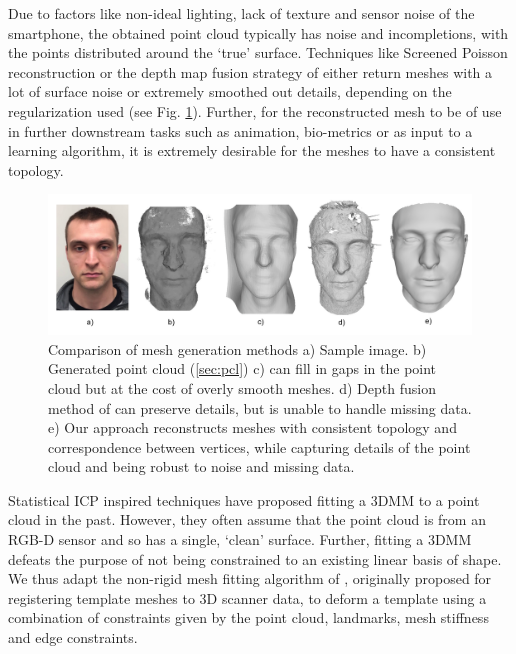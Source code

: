 \documentclass[10pt,twocolumn,letterpaper]{article}
\begin{document}
Due to factors like non-ideal lighting, lack of texture and sensor noise of the smartphone, the obtained point cloud typically has noise and incompletions, with the points distributed around the `true' surface.
 Techniques like Screened Poisson reconstruction or the depth map fusion strategy of \cite{hernandez2015near} either return meshes with a lot of surface noise or extremely smoothed out details, depending on the regularization used (see Fig. \ref{fig:mesh_comp}). Further, for the reconstructed mesh to be of use in further downstream tasks such as animation, bio-metrics or as input to a learning algorithm, it is extremely desirable for the meshes to have a consistent topology. \\
 \begin{figure}[t]
\begin{center}
   \includegraphics[width=0.95\linewidth]{images/meshing_compare.png}
\end{center}
   \caption{Comparison of mesh generation methods a) Sample image. b) Generated point cloud (\ref{sec:pcl}) c) \cite{kazhdan2013screened} can fill in gaps in the point cloud but at the cost of overly smooth meshes. d) Depth fusion method of \cite{hernandez2015near} can preserve details, but is unable to handle missing data. e) Our approach reconstructs meshes with consistent topology and correspondence between vertices, while capturing details of the point cloud and being robust to noise and missing data. }
\label{fig:mesh_comp}
\end{figure}

 Statistical ICP inspired techniques have proposed fitting a 3DMM to a point cloud \cite{schneider2009fitting,bazik2017robust,blanz2004statistical} in the past. However, they often assume that the point cloud is from an RGB-D sensor and so has a single, `clean' surface. Further, fitting a 3DMM defeats the purpose of not being constrained to an existing linear basis of shape.
 We thus adapt the non-rigid mesh fitting algorithm of \cite{amberg2007optimal}, originally proposed for registering template meshes to 3D scanner data, to deform a template using a combination of constraints given by the point cloud, landmarks, mesh stiffness and edge constraints. 
 
\end{document}
